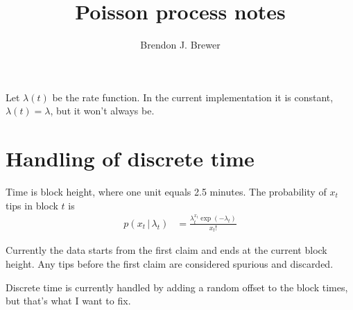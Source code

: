 \documentclass[a4paper, 12pt]{article}
\title{Poisson process notes}
\author{Brendon J. Brewer}
\date{}
\begin{document}
\maketitle


\setlength{\parindent}{0pt}
\setlength{\parskip}{8pt}

Let $\lambda(t)$ be the rate function. In the current implementation
it is constant, $\lambda(t) = \lambda$,
but it won't always be.

\section{Handling of discrete time}
Time is block height, where one unit equals 2.5 minutes.
The probability of $x_t$ tips in block $t$ is
\begin{align}
p(x_t \,|\, \lambda_t) &= \frac{\lambda_t^{x_t}\exp(-\lambda_t)}{x_t!}
\end{align}

Currently the data starts from the first claim and ends at the current
block height. Any tips before the first claim are considered spurious and
discarded.

Discrete time is currently handled by adding a random offset to the
block times, but that's what I want to fix.



\end{document}
